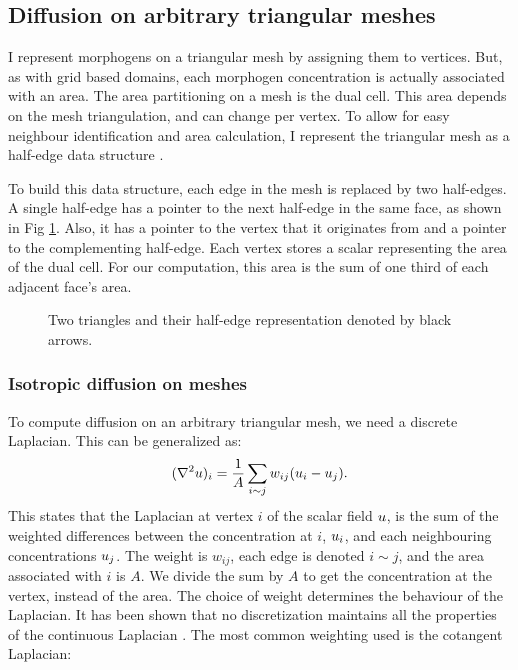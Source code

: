 \begin{figure}[H]
\centering
{}
\end{figure}

\subsection{Diffusion on arbitrary triangular meshes}
I represent morphogens on a triangular mesh by assigning them to vertices. But, as with grid based domains, each morphogen concentration is actually associated with an area. The area partitioning on a mesh is the dual cell. This area depends on the mesh triangulation, and can change per vertex. To allow for easy neighbour identification and area calculation, I represent the triangular mesh as a half-edge data structure \citep{Mantyla1988}. 

To build this data structure, each edge in the mesh is replaced by two half-edges. A single half-edge has a pointer to the next half-edge in the same face, as shown in Fig \ref{fig:halfEdgeMesh}. Also, it has a pointer to the vertex that it originates from and a pointer to the complementing half-edge. Each vertex stores a scalar representing the area of the dual cell. For our computation, this area is the sum of one third of each adjacent face's area. %

\begin{figure}[H]
	\centering
	\caption{Two triangles and their half-edge representation denoted by black arrows.}
	\label{fig:halfEdgeMesh}
\end{figure}

\subsubsection*{Isotropic diffusion on meshes}
To compute diffusion on an arbitrary triangular mesh, we need a discrete Laplacian. This can be generalized as:
\[
(\nabla^2{} u)_i = \frac{1}{A} \sum_{i \sim j} w_{ij}(u_i - u_j).
\]
This states that the Laplacian at vertex $i$ of the scalar field $u$, is the sum of the weighted differences between the concentration at $i$, $u_i$, and each neighbouring concentrations $u_j$. The weight is $w_{ij}$, each edge is denoted $i \sim j$, and the area associated with $i$ is $A$. We divide the sum by $A$ to get the concentration at the vertex, instead of the area. The choice of weight determines the behaviour of the Laplacian. It has been shown that no discretization maintains all the properties of the continuous Laplacian \citep{Wardetzky2007}. The most common weighting used is the cotangent Laplacian:

